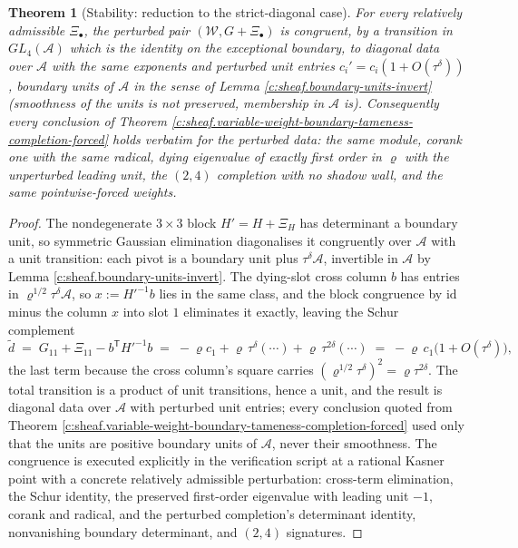 \documentclass[11pt]{article}
\newtheorem{theorem}{Theorem}[section]
\theoremstyle{definition}
\theoremstyle{plain}
\providecommand{\shW}{}\renewcommand{\shW}{\mathcal{W}}
\begin{document}
\begin{theorem}[Stability: reduction to the strict-diagonal case]\label{c:sheaf.stability-reduction-strict-diagonal-case}
For every relatively admissible $\Xi_\bullet$, the perturbed pair $(\shW, G + \Xi_\bullet)$ is congruent, by a transition in $GL_4(\mathcal{A})$ which is the identity on the exceptional boundary, to diagonal data over $\mathcal{A}$ with the \emph{same} exponents and perturbed unit entries $c_i' = c_i(1 + O(\tau^\delta))$, boundary units of $\mathcal{A}$ in the sense of Lemma \ref{c:sheaf.boundary-units-invert} (smoothness of the units is not preserved, membership in $\mathcal{A}$ is). Consequently every conclusion of Theorem \ref{c:sheaf.variable-weight-boundary-tameness-completion-forced} holds verbatim for the perturbed data: the same module, corank one with the same radical, dying eigenvalue of exactly first order in $\varrho$ with the unperturbed leading unit, the $(2,4)$ completion with no shadow wall, and the same pointwise-forced weights.
\end{theorem}
\begin{proof}
The nondegenerate $3\times3$ block $H' = H + \Xi_H$ has determinant a boundary unit, so symmetric Gaussian elimination diagonalises it congruently over $\mathcal{A}$ with a unit transition: each pivot is a boundary unit plus $\tau^\delta\mathcal{A}$, invertible in $\mathcal{A}$ by Lemma \ref{c:sheaf.boundary-units-invert}. The dying-slot cross column $b$ has entries in $\varrho^{1/2}\tau^\delta\mathcal{A}$, so $x := H'^{-1}b$ lies in the same class, and the block congruence by $\mathrm{id}$ minus the column $x$ into slot $1$ eliminates it exactly, leaving the Schur complement
\[
\tilde d \;=\; G_{11} + \Xi_{11} - b^{\mathsf T}H'^{-1}b \;=\; -\varrho c_1 + \varrho\,\tau^\delta(\cdots) + \varrho\,\tau^{2\delta}(\cdots) \;=\; -\varrho\,c_1\bigl(1 + O(\tau^\delta)\bigr),
\]
the last term because the cross column's square carries $(\varrho^{1/2}\tau^\delta)^2 = \varrho\tau^{2\delta}$. The total transition is a product of unit transitions, hence a unit, and the result is diagonal data over $\mathcal{A}$ with perturbed unit entries; every conclusion quoted from Theorem \ref{c:sheaf.variable-weight-boundary-tameness-completion-forced} used only that the units are positive boundary units of $\mathcal{A}$, never their smoothness. The congruence is executed explicitly in the verification script at a rational Kasner point with a concrete relatively admissible perturbation: cross-term elimination, the Schur identity, the preserved first-order eigenvalue with leading unit $-1$, corank and radical, and the perturbed completion's determinant identity, nonvanishing boundary determinant, and $(2,4)$ signatures.

\end{proof}
\end{document}

